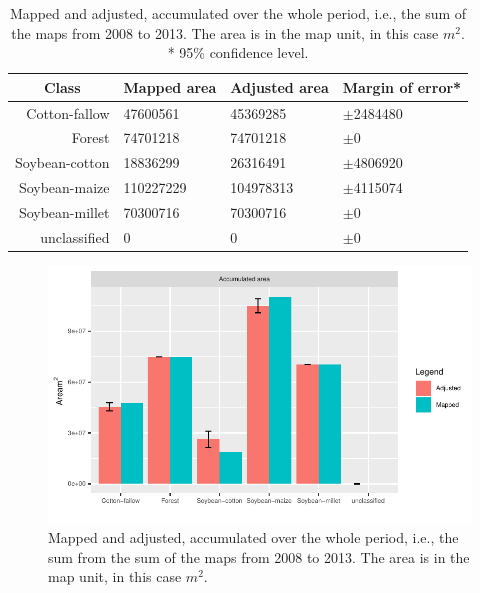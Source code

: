 \documentclass[article,shortnames]{jss}
\begin{document}
\begin{table}[!ht]
\centering
\begin{tabular}{rlll}
  \hline
  \multicolumn{1}{c}{Class} & Mapped area & Adjusted area & Margin of error*\\
 \hline
Cotton-fallow & 47600561 & 45369285 & $\pm$2484480 \\ 
  Forest & 74701218 & 74701218 & $\pm$0 \\ 
  Soybean-cotton & 18836299 & 26316491 & $\pm$4806920 \\ 
  Soybean-maize & 110227229 & 104978313 & $\pm$4115074 \\ 
  Soybean-millet & 70300716 & 70300716 & $\pm$0 \\ 
  unclassified & 0 & 0 & $\pm$0 \\ 
   \hline 
\end{tabular}
\caption{\label{tab:map-adjusted-area}Mapped and adjusted, accumulated over the whole period, i.e., the sum of the maps from 2008 to 2013. The area is in the map unit, in this case $m^2$. * 95\% confidence level.} 
\end{table}

\begin{CodeChunk}
\begin{figure}[!ht]

{\centering \includegraphics{dtwSat_files/figure-latex/plot-area-and-uncertainty-1} 

}

\caption[Mapped and adjusted, accumulated over the whole period, i.e., the sum from the sum of the maps from 2008 to 2013]{Mapped and adjusted, accumulated over the whole period, i.e., the sum from the sum of the maps from 2008 to 2013. The area is in the map unit, in this case $m^2$.}\label{fig:plot-area-and-uncertainty}
\end{figure}
\end{CodeChunk}
\end{document}
